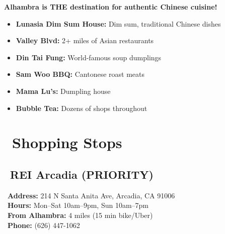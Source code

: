 \documentclass[10pt,letterpaper]{article}
\begin{document}
\begin{tipbox}[title=Must-Try:]
\textbf{Alhambra is THE destination for authentic Chinese cuisine!}
\begin{small}
\begin{itemize}[leftmargin=0.2in,itemsep=1pt]
\item \textbf{Lunasia Dim Sum House:} Dim sum, traditional Chinese dishes
\item \textbf{Valley Blvd:} 2+ miles of Asian restaurants
\item \textbf{Din Tai Fung:} World-famous soup dumplings
\item \textbf{Sam Woo BBQ:} Cantonese roast meats
\item \textbf{Mama Lu's:} Dumpling house
\item \textbf{Bubble Tea:} Dozens of shops throughout
\end{itemize}
\end{small}
\end{tipbox}



\section*{\faShoppingCart\ Shopping Stops}

\subsection*{\faStore\ REI Arcadia (PRIORITY)}

\begin{infobox}
\faMapMarker\ \textbf{Address:} 214 N Santa Anita Ave, Arcadia, CA 91006\\
\faClock\ \textbf{Hours:} Mon--Sat 10am--9pm, Sun 10am--7pm\\
\faBicycle\ \textbf{From Alhambra:} 4 miles (15 min bike/Uber)\\
\faPhone\ \textbf{Phone:} (626) 447-1062
\end{infobox}
\end{document}
